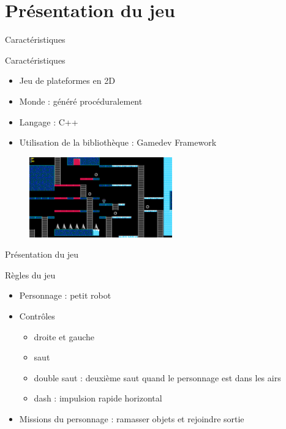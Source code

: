 \documentclass{beamer}
\begin{document}
{\section{Présentation du jeu}
\begin{frame}{Caractéristiques}
    \begin{block}{Caractéristiques}
        \begin{itemize}
            \item[\bullet] Jeu de plateformes en 2D
            \item[\bullet] Monde : généré procéduralement
            \item[\bullet] Langage : C++
            \item[\bullet] Utilisation de la bibliothèque : Gamedev Framework
        \end{itemize}
    \end{block}
    \begin{figure}
            \centering
            \includegraphics[width=0.55\textwidth]{images/world_example}
        \end{figure}
\end{frame}

\begin{frame}{Présentation du jeu}
    \begin{block}{Règles du jeu}
        \begin{itemize}
            \item[\bullet] Personnage : petit robot
            \item[\bullet] Contrôles
            \begin{itemize}
                \item droite et gauche
                \item saut
                \item double saut : deuxième saut quand le personnage est dans les airs
                \item dash : impulsion rapide horizontal
            \end{itemize}
            \item[\bullet] Missions du personnage : ramasser objets et rejoindre sortie
        \end{itemize}
    \end{block}
\end{frame}

}
\end{document}
